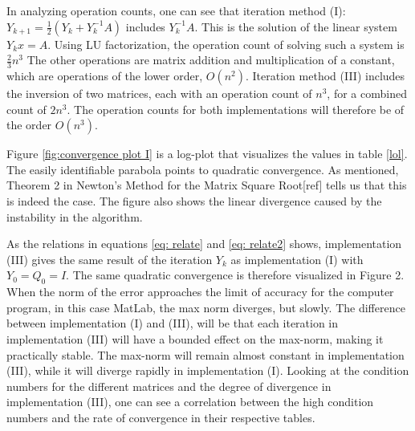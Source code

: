 In analyzing operation counts, one can see that iteration method (I): $Y_{k+1}=\frac{1}{2}(Y_{k}+Y_{k}^{-1}A)$ includes $Y_{k}^{-1}A$. This is the solution of the linear system $Y_{k}x=A$. Using LU factorization, the operation count of solving such a system is $\frac{2}{3}n^{3}$ The other operations are matrix addition and multiplication of a constant, which are operations of the lower order, $O(n^{2})$. Iteration method (III) includes the inversion of two matrices, each with an operation count of $n^{3}$, for a combined count of $2n^{3}$. The operation counts for both implementations will therefore be of the order $O(n^3)$.

Figure \ref{fig:convergence plot I} is a log-plot that visualizes the values in table \ref{lol}. The easily identifiable parabola points to quadratic convergence. As mentioned, Theorem 2 in Newton's Method for the Matrix Square Root[ref] tells us that this is indeed the case. The figure also shows the linear divergence caused by the instability in the algorithm. 

As the relations in equations \ref{eq: relate} and \ref{eq: relate2}  shows, implementation (III) gives the same result of the iteration  $Y_k$ as implementation (I) with $Y_{0}=Q_{0}=I$. The same quadratic convergence is therefore visualized in Figure 2. When the norm of the error approaches the limit of accuracy for the computer program, in this case MatLab, the max norm diverges, but slowly. The difference between implementation (I) and (III), will be that each iteration in implementation (III) will have a bounded effect on the max-norm, making it practically stable. The max-norm will remain almost constant in implementation (III), while it will diverge rapidly in implementation (I). Looking at the condition numbers for the different matrices and the degree of divergence in implementation (III), one can see a correlation between the high condition numbers and the rate of convergence in their respective tables.




